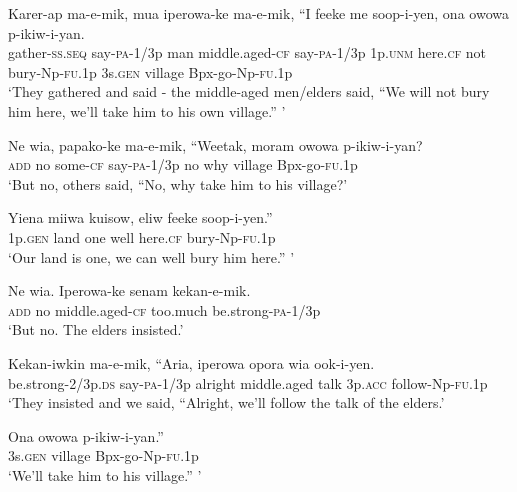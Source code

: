 {\ea\label{ex:a:x52}
\gll  Karer-ap  ma-e-mik,  mua  iperowa-ke  ma-e-mik,  “I             feeke  me  soop-i-yen,  ona  owowa  p-ikiw-i-yan. \\
gather-\textsc{ss.seq}  say-\textsc{pa}-1/3p  man  middle.aged-\textsc{cf}  say-\textsc{pa}-1/3p  1p.\textsc{unm}  here.\textsc{cf}  not  bury-Np-\textsc{fu}.1p  3s.\textsc{gen}  village  Bpx-go-Np-\textsc{fu}.1p \\


\glt ‘They gathered and said - the middle-aged men/elders said, “We will not bury him here, we’ll take him to his own village.” ’ \\
\z


\ea\label{ex:a:x53}
\gll  Ne  wia,  papako-ke  ma-e-mik,  “Weetak,  moram  owowa  p-ikiw-i-yan? \\
\textsc{add}  no  some-\textsc{cf}  say-\textsc{pa}-1/3p  no  why  village  Bpx-go-\textsc{fu}.1p \\
\glt ‘But no, others said, “No, why take him to his village?’ \\
\z


\ea\label{ex:a:x54}
\gll  Yiena  miiwa  kuisow,  eliw  feeke  soop-i-yen.” \\
1p.\textsc{gen}  land  one  well  here.\textsc{cf}  bury-Np-\textsc{fu}.1p \\
\glt ‘Our land is one, we can well bury him here.” ’ \\
\z


\ea\label{ex:a:x55}
\gll  Ne  wia.  Iperowa-ke  senam  kekan-e-mik. \\
\textsc{add}  no  middle.aged-\textsc{cf}  too.much  be.strong-\textsc{pa}-1/3p \\
\glt ‘But no. The elders insisted.’ \\
\z


\ea\label{ex:a:x56}
\gll  Kekan-iwkin  ma-e-mik,  “Aria,  iperowa  opora  wia            ook-i-yen. \\
be.strong-2/3p.\textsc{ds}  say-\textsc{pa}-1/3p  alright  middle.aged  talk  3p.\textsc{acc}   follow-Np-\textsc{fu}.1p \\


\glt ‘They insisted and we said, “Alright, we’ll follow the talk of the elders.’ \\
\z


\ea\label{ex:a:x57}
\gll  Ona  owowa  p-ikiw-i-yan.” \\
3s.\textsc{gen}  village  Bpx-go-Np-\textsc{fu}.1p \\
\glt ‘We’ll take him to his village.” ’ \\
\z


}
